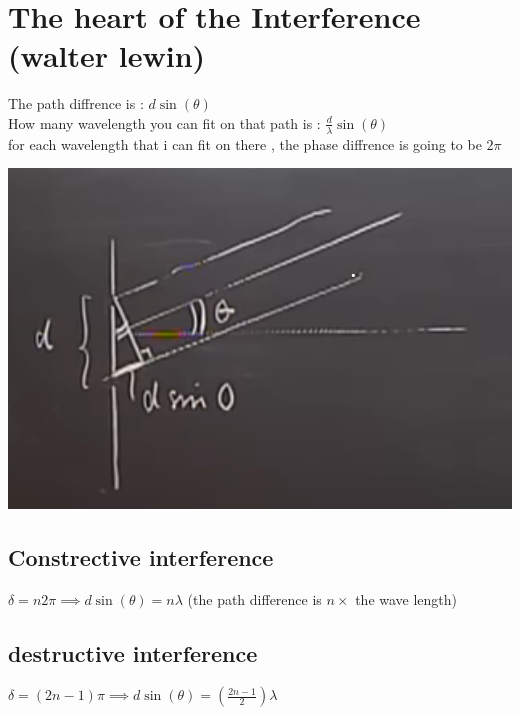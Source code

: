 \documentclass[12pt]{book}
\begin{document}
        \section{The heart of the Interference (walter lewin)}
            \begin{minipage}{0.59\linewidth}
                The path diffrence is : $ d\sin(\theta) $ \\
                How many wavelength you can fit on that path is : $ \frac{d}{\lambda}\sin(\theta)  $\\
                for each wavelength that i can fit on there , the phase diffrence is going to be $ 2\pi $ \\
            \end{minipage}
            \begin{minipage}{0.4\linewidth}
                \includegraphics[width=\linewidth]{pic/interfernce_lewin.png}
            \end{minipage}
            \subsection{Constrective interference}
                $ \delta =n2\pi \implies d\sin(\theta)=n\lambda$ (the path difference is $ n \times $ the wave length) 
            \subsection{destructive interference}
                $ \delta = (2n-1)\pi \implies d\sin(\theta) = (\frac{2n-1}{2})\lambda $
\end{document}
